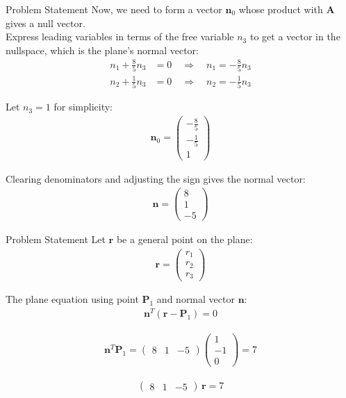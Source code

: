 \documentclass{beamer}
\numberwithin{equation}{section}
\theoremstyle{remark}
\newcommand{\myvec}[1]{\ensuremath{\begin{pmatrix}#1\end{pmatrix}}}
\let\vec\mathbf
\begin{document}
\begin{frame}{Problem Statement}
Now, we need to form a vector $\vec{n}_0$ whose product with $\vec{A}$ gives a null vector.\\
\noindent Express leading variables in terms of the free variable \(n_3\) to get a vector in the nullspace, which is the plane's normal vector:
\begin{align}
n_1 + \frac{8}{5} n_3 &= 0 \quad \Rightarrow \quad n_1 = -\frac{8}{5} n_3 \\
n_2 + \frac{1}{5} n_3 &= 0 \quad \Rightarrow \quad n_2 = -\frac{1}{5} n_3
\end{align}

\noindent Let \(n_3 = 1\) for simplicity:
\begin{align}
\vec{n}_0 = \myvec{-\frac{8}{5} \\[1mm] -\frac{1}{5} \\[1mm] 1}
\end{align}

\noindent Clearing denominators and adjusting the sign gives the normal vector:
\begin{align}
\vec{n} = \myvec{8\\1\\-5}
\end{align}
\end{frame}
\begin{frame}{Problem Statement}
\noindent Let \(\vec{r}\) be a general point on the plane:
\begin{align}
\vec{r} = \myvec{r_1\\ r_2\\ r_3}
\end{align}

\noindent The plane equation using point \(\vec{P}_1\) and normal vector \(\vec{n}\):
\begin{align}
\vec{n}^T(\vec{r} - \vec{P}_1) = 0
\end{align}

\begin{align}
\vec{n}^T \vec{P}_1 = \myvec{8 & 1 & -5}\myvec{1\\-1\\0} = 7
\end{align}

\begin{align}
\boxed{\myvec{8 & 1 & -5}\,\vec{r} = 7}
\end{align}
\end{frame}
\end{document}
